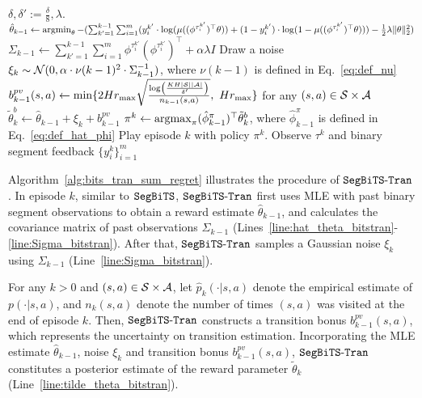 \begin{algorithm}[t]
	\caption{$\bitssegtran$} \label{alg:bits_tran_sum_regret}
	\begin{algorithmic}[1]
	 $\delta,\delta':=\frac{\delta}{8},\lambda$.
		\STATE $\hat{\theta}_{k-1} \leftarrow \argmin_{\theta} -(\sum_{k'=1}^{k-1} \sum_{i=1}^{m} ( y^{k'}_i \cdot \log(\mu((\phi^{\tau^{k'}_i})^\top \theta)) + (1-y^{k'}_i) \cdot \log(1-\mu((\phi^{\tau^{k'}_i})^\top \theta) ) ) - \frac{1}{2} \lambda \|\theta\|_2^2)$\; \label{line:hat_theta_bitstran}
		\STATE $\Sigma_{k-1} \leftarrow  \sum_{k'=1}^{k-1} \sum_{i=1}^{m} \phi^{\tau^{k'}_i} (\phi^{\tau^{k'}_i})^\top + \alpha \lambda I$\; \label{line:Sigma_bitstran}
		\STATE Draw a noise $\xi_k \sim \mathcal{N}(0, \alpha \cdot \nu(k-1)^2 \cdot \Sigma_{k-1}^{-1})$, where $\nu(k-1)$ is defined in Eq.~\eqref{eq:def_nu}\; \label{line:noise_bitstran}
		\STATE $b^{pv}_{k-1}(s,a) \leftarrow \min\{ 2Hr_{\max} \sqrt{\frac{\log\sbr{\frac{KH|\cS||\cA| }{\delta'}}}{n_{k-1}(s,a)}} ,\ Hr_{\max}\}$ for any $(s,a) \in \mathcal{S} \times \mathcal{A}$\; \label{line:b_pv_bitstran}
		\STATE $\tilde{\theta}^{b}_k \leftarrow \hat{\theta}_{k-1}+\xi_k+b^{pv}_{k-1}$\; \label{line:tilde_theta_bitstran}
		\STATE $\pi^k \leftarrow \argmax_{\pi} (\hat{\phi}^{\pi}_{k-1})^\top \tilde{\theta}^{b}_k$, where $\hat{\phi}^{\pi}_{k-1}$ is defined in Eq.~\eqref{eq:def_hat_phi}\; \label{line:pi_k_bitstran}
		\STATE Play episode $k$ with policy $\pi^k$. Observe $\tau^k$ and binary segment feedback $\{y^k_i\}_{i=1}^{m}$\; \label{line:play_bitstran}
	\ENDFOR
	\end{algorithmic}
\end{algorithm}


Algorithm~\ref{alg:bits_tran_sum_regret} illustrates the procedure of $\bitssegtran$. In episode $k$, similar to $\mathtt{SegBiTS}$, $\bitssegtran$ first uses MLE with past binary segment observations to obtain a reward estimate $\hat{\theta}_{k-1}$, and calculates the covariance matrix of past observations $\Sigma_{k-1}$ (Lines~\ref{line:hat_theta_bitstran}-\ref{line:Sigma_bitstran}). After that, $\bitssegtran$ samples a Gaussian noise $\xi_k$ using $\Sigma_{k-1}$ (Line~\ref{line:Sigma_bitstran}).

For any $k>0$ and $(s,a) \in \mathcal{S} \times \mathcal{A}$, let $\hat{p}_k(\cdot|s,a)$ denote the empirical estimate of $p(\cdot|s,a)$, and $n_k(s,a)$ denote the number of times $(s,a)$ was visited at the end of episode $k$.
Then, $\bitssegtran$ constructs a transition bonus $b^{pv}_{k-1}(s,a)$, which represents the uncertainty on transition estimation.  Incorporating the MLE estimate $\hat{\theta}_{k-1}$, noise $\xi_k$ and transition bonus $b^{pv}_{k-1}(s,a)$, $\bitssegtran$ constitutes a posterior estimate of the reward parameter $\tilde{\theta}_k$ (Line~\ref{line:tilde_theta_bitstran}).

